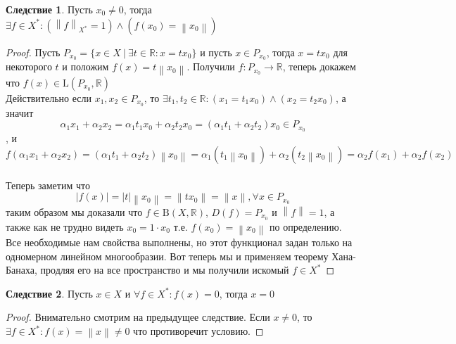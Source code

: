 \documentclass[12pt,a4paper]{article}
\theoremstyle{definition}
\newtheorem{corollary}{Следствие}[theorem]
\newcommand{\Real}{\mathbb{R}}
\newcommand{\norm}[1]{\left\lVert#1\right\rVert}
\newcommand{\setbuild}[2]{\{#1\:|\:#2\}}
\newcommand{\bounded}[2]{\textrm{B}(#1, #2)}
\newcommand{\linear}[2]{\textrm{L}(#1, #2)}
\begin{document}
\begin{corollary}
	Пусть $x_0 \neq 0$, тогда \\ $\exists f\in X^*: (\norm{f}_{X^*} = 1) \wedge (f(x_0) = \norm{x_0})$
\end{corollary}
\begin{proof}
	Пусть $P_{x_0} = \setbuild{x\in X}{\exists t\in\Real: x = tx_0}$ и пусть $x\in P_{x_0}$, тогда $x=tx_0$ для некоторого $t$ и положим $f(x)=t\norm{x_0}$. Получили $f:P_{x_0} \to \Real$, теперь докажем что $f(x)\in \linear{P_{x_0}}{\Real}$ \\
	
	Действительно если $x_1,x_2 \in P_{x_0}$, то $\exists t_1,t_2\in\Real: (x_1 = t_1 x_0) \wedge (x_2 = t_2 x_0)$, а значит $$\alpha_1 x_1 + \alpha_2 x_2 = \alpha_1 t_1 x_0 + \alpha_2 t_2 x_0 = (\alpha_1 t_1 + \alpha_2 t_2)  x_0 \in P_{x_0}$$, и $$f(\alpha_1 x_1 + \alpha_2 x_2) = (\alpha_1 t_1 + \alpha_2 t_2)\norm{x_0} = \alpha_1 (t_1 \norm{x_0}) + \alpha_2 (t_2 \norm{x_0}) = \alpha_2 f(x_1) + \alpha_2 f(x_2)$$ \\
	
	Теперь заметим что $$|f(x)| = |t|\norm{x_0} = \norm{tx_0} = \norm{x}, \forall x \in P_{x_0}$$ таким образом мы доказали что $f\in\bounded{X}{\Real}$, $D(f) = P_{x_0}$ и $\norm{f} = 1$, а также как не трудно видеть $x_0 = 1\cdot x_0$ т.е. $f(x_0) = \norm{x_0}$ по определению. Все необходимые нам свойства выполнены, но этот функционал задан только на одномерном линейном многообразии. Вот теперь мы и применяем теорему Хана-Банаха, продляя его на все пространство и мы получили искомый $f\in X^*$
\end{proof}

\begin{corollary}
	Пусть $x\in X$ и $\forall f \in X^* : f(x)=0$, тогда $x = 0$
\end{corollary}
\begin{proof}
	Внимательно смотрим на предыдущее следствие. Если $x \neq 0$, то $\exists f \in X^*: f(x) = \norm{x} \neq 0$ что противоречит условию.
\end{proof}
\end{document}

